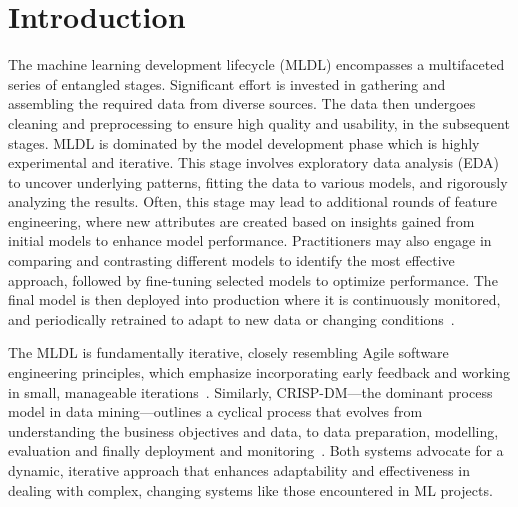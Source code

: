 \documentclass[smallextended]{svjour3}       %
\begin{document}

\section{Introduction}
The machine learning development lifecycle (MLDL) encompasses a multifaceted series of entangled stages. Significant effort is invested in gathering and assembling the required data from diverse sources. The data then undergoes cleaning and preprocessing to ensure high quality and usability, in the subsequent stages. MLDL is dominated by the model development phase which is highly experimental and iterative. This stage involves exploratory data analysis (EDA) to uncover underlying patterns, fitting the data to various models, and rigorously analyzing the results. Often, this stage may lead to additional rounds of feature engineering, where new attributes are created based on insights gained from initial models to enhance model performance. Practitioners may also engage in comparing and contrasting different models to identify the most effective approach, followed by fine-tuning selected models to optimize performance. The final model is then deployed into production where it is continuously monitored, and periodically retrained to adapt to new data or changing conditions~\citep{haakman2021ai,amershi2019software,sculley2015hidden}.

The MLDL is fundamentally iterative, closely resembling Agile software engineering principles, which emphasize incorporating early feedback and working in small, manageable iterations~\citep{betz2018managing}. Similarly, CRISP-DM---the dominant process model in data mining---outlines a cyclical process that evolves from understanding the business objectives and data, to data preparation, modelling, evaluation and finally deployment and monitoring~\citep{martinez-plumed2021crisp-dm}. Both systems advocate for a dynamic, iterative approach that enhances adaptability and effectiveness in dealing with complex, changing systems like those encountered in ML projects.
\end{document}
